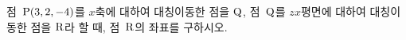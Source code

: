 점~$\mathrm{P}(3{,}\mkern3mu\mathopen{}2{,}\mkern3mu\mathopen{}-4)$를 $x$축에 대하여 대칭이동한 점을 $\mathrm{Q}$, 점~$\mathrm{Q}$를 $zx$평면에 대하여 대칭이동한 점을 $\mathrm{R}$라 할 때, 점~$\mathrm{R}$의 좌표를 구하시오.

